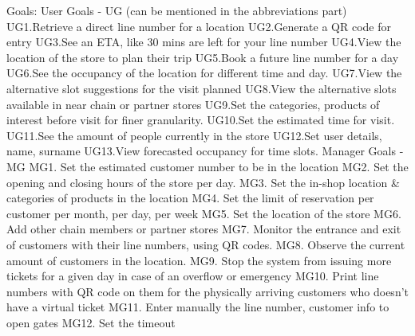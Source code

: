 Goals:
			User Goals - UG (can be mentioned in the abbreviations part)
			UG1.Retrieve a direct line number for a location
			UG2.Generate a QR code for entry
      UG3.See an ETA, like 30 mins are left for your line number
      UG4.View the location of the store to plan their trip
      UG5.Book a future line number for a day
      UG6.See the occupancy of the location for different time and day.
      UG7.View the alternative slot suggestions for the visit planned
      UG8.View the alternative slots available in near chain or partner stores
      UG9.Set the categories, products of interest before visit for finer granularity.
      UG10.Set the estimated time for visit.
      UG11.See the amount of people currently in the store
      UG12.Set user details, name, surname
      UG13.View forecasted occupancy for time slots.
      Manager Goals - MG
      MG1. Set the estimated customer number to be in the location
      MG2. Set the opening and closing hours of the store per day.
      MG3. Set the in-shop location & categories of products in the location
      MG4. Set the limit of reservation per customer per month, per day, per week
      MG5. Set the location of the store
      MG6. Add other chain members or partner stores
      MG7. Monitor the entrance and exit of customers with their line numbers, using QR codes.
      MG8. Observe the current amount of customers in the location.
      MG9. Stop the system from issuing more tickets for a given day in case of an overflow or emergency
      MG10. Print line numbers with QR code on them for the physically arriving customers who doesn't have a virtual ticket
      MG11. Enter manually the line number, customer info to open gates
      MG12. Set the timeout



